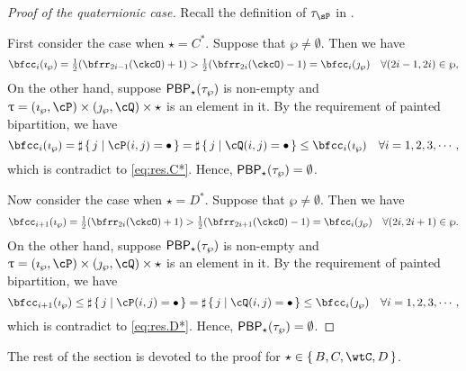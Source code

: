 \documentclass[counting_main.tex]{subfiles}
\begin{document}
\begin{proof}[Proof of {} the quaternionic case]

  Recall the definition of $\tau_{\sP}$ in .

  \smallskip

First consider the case when $\star = C^{*}$.
Suppose that $\wp \neq \emptyset$. Then we have
\begin{equation}\label{eq:res.C*}
  \bfcc_{i}(\imath_{\wp}) = \half(\bfrr_{2i-1}(\ckcO)+1)>
  \half(\bfrr_{2i}(\ckcO)-1) = \bfcc_{i}(\jmath_{\wp})
  \quad \forall (2i-1, 2i)\in \wp,
\end{equation}
On the other hand, suppose $\mathsf{PBP}_{\star}(\tau_{\wp})$ is non-empty and
$\uptau = (\imath_{\wp}, \cP)\times (\jmath_{\wp},\cQ)\times \star$
is an element in it.
By the requirement of painted bipartition, we have
\[
  \bfcc_{i}(\imath_{\wp}) = \sharp\set{j| \cP(i,j)=\bullet}
= \sharp\set{j| \cQ(i,j)=\bullet}
\leq \bfcc_{i}(\imath_{\wp}) \quad \forall i=1,2,3,\cdots,
\]
which is contradict to \eqref{eq:res.C*}.
Hence, $\mathsf{PBP}_{\star}(\tau_{\wp})= \emptyset$.

\smallskip

Now consider the case when $\star = D^{*}$.
Suppose that $\wp \neq \emptyset$. Then we have
\begin{equation}\label{eq:res.D*}
  \bfcc_{i+1}(\imath_{\wp}) = \half(\bfrr_{2i}(\ckcO)+1)>
  \half(\bfrr_{2i+1}(\ckcO)-1) = \bfcc_{i}(\jmath_{\wp})
  \quad \forall (2i, 2i+1)\in \wp.
\end{equation}
On the other hand, suppose $\mathsf{PBP}_{\star}(\tau_{\wp})$ is non-empty and
$\uptau = (\imath_{\wp}, \cP)\times (\jmath_{\wp},\cQ)\times \star$
is an element in it.
By the requirement of painted bipartition, we have
\[
  \bfcc_{i+1}(\imath_{\wp}) \leq \sharp\set{j| \cP(i,j)=\bullet}
  =\sharp\set{j| \cQ(i,j)=\bullet}
  \leq \bfcc_{i}(\jmath_{\wp}) \quad \forall i = 1,2,3, \cdots,
\]
which is contradict to \eqref{eq:res.D*}.
Hence, $\mathsf{PBP}_{\star}(\tau_{\wp})= \emptyset$.

\end{proof}


The rest of the section is devoted to the proof for
$\star \in \set{B,C,\wtC,D}$.
\end{document}
